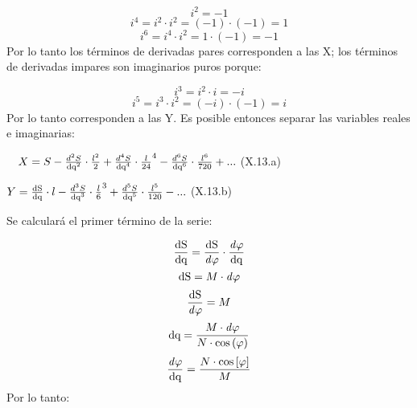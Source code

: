 \documentclass{tufte-book}
\newcommand\normalsubformula[1]{\text{\mathversion{normal}$#1$}}
\begin{document}
\begin{equation*}
{i^{{2}}=-1}
\end{equation*}
\begin{equation*}
{i^{{4}}=i^{{2}}\cdot i^{{2}}=\left(-1\right)\cdot \left(-1\right)=1}
\end{equation*}
\begin{equation*}
{i^{{6}}=i^{{4}}\cdot i^{{2}}=1\cdot \left(-1\right)=-1}
\end{equation*}
Por lo tanto los términos de derivadas pares corresponden a las X; los
términos de derivadas impares son imaginarios puros porque:

\begin{equation*}
{i^{{3}}=i^{{2}}\cdot i=-i}
\end{equation*}
\begin{equation*}
{i^{{5}}=i^{{3}}\cdot i^{{2}}=\left(-i\right)\cdot \left(-1\right)=i}
\end{equation*}
Por lo tanto corresponden a las Y. Es posible entonces separar las
variables reales e imaginarias:

\ \  ${X=S-\frac{d^{{2}}S}{\normalsubformula{\text{dq}}^{{2}}}\cdot
{\frac{l^{{2}}}{2}}+\frac{d^{{4}}S}{\normalsubformula{\text{dq}}^{{4}}}\cdot
{\frac{l}{\text{24}}}^{{4}}-\frac{d^{{6}}S}{\normalsubformula{\text{dq}}^{{6}}}\cdot
{\frac{l^{{6}}}{\text{720}}}+\text{.}\text{.}\text{.}}$  (X.13.a)


${Y=\frac{\normalsubformula{\text{dS}}}{\normalsubformula{\text{dq}}}\cdot
l-\frac{d^{{3}}S}{\normalsubformula{\text{dq}}^{{3}}}\cdot
{\frac{l}{6}}^{{3}}+\frac{d^{{5}}S}{\normalsubformula{\text{dq}}^{{5}}}\cdot
{\frac{l^{{5}}}{\text{120}}}-\text{.}\text{.}\text{.}}$  (X.13.b)

Se calculará el primer término de la serie:

\begin{equation*}
{\frac{\normalsubformula{\text{dS}}}{\normalsubformula{\text{dq}}}=\frac{\normalsubformula{\text{dS}}}{\mathit{d\varphi
}}\cdot {\frac{\mathit{d\varphi }}{\normalsubformula{\text{dq}}}}}
\end{equation*}
\begin{equation*}
{\normalsubformula{\text{dS}}=M\cdot \mathit{d\varphi }}
\end{equation*}
\begin{equation*}
{\frac{\normalsubformula{\text{dS}}}{\mathit{d\varphi }}=M}
\end{equation*}
\begin{equation*}
{\normalsubformula{\text{dq}}=\frac{M\cdot \mathit{d\varphi }}{N\cdot
\text{cos}\left(\varphi \right)}}
\end{equation*}
\begin{equation*}
{\frac{\mathit{d\varphi }}{\normalsubformula{\text{dq}}}=\frac{N\cdot
\text{cos}\left[\varphi \right]}{M}}
\end{equation*}
Por lo tanto:
\end{document}
